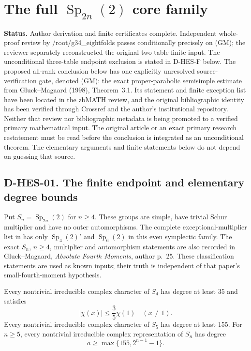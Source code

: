 \section{The full $\operatorname{Sp}_{2n}(2)$ core family}
\label{sec:higher-even-symplectic-draft}

\noindent\textbf{Status.} Author derivation and finite certificates complete. Independent whole-proof
review by /root/g34\_eightfolds passes conditionally precisely on (GM);
the reviewer separately reconstructed the original two-table finite input.
The unconditional three-table endpoint exclusion is stated in D-HES-F below. The proposed all-rank conclusion below
has one explicitly unresolved source-verification gate, denoted (GM): the exact
proper-parabolic semisimple estimate from Gluck--Magaard (1998), Theorem~3.1.
Its statement and finite exception list have been located in the zbMATH review,
and the original bibliographic identity has been verified through Crossref and
the author's institutional repository. Neither that review nor bibliographic
metadata is being promoted to a verified primary mathematical input. The
original article or an exact primary research restatement must be read before
the conclusion is integrated as an unconditional theorem. The elementary
arguments and finite statements below do not depend on guessing that source.

\subsection*{D-HES-01. The finite endpoint and elementary degree bounds}

Put $S_n=\operatorname{Sp}_{2n}(2)$ for $n\ge4$. These groups are simple,
have trivial Schur multiplier and have no outer automorphisms. The complete
exceptional-multiplier list in \cite[Chapter~5, Table~1, numbered p.~35]{BI:HHM}
has only $\operatorname{Sp}_4(2)'$ and $\operatorname{Sp}_6(2)$ in this
even symplectic family. The exact $S_n$, $n\ge4$, multiplier and automorphism
statements are also recorded in Gluck--Magaard, \emph{Absolute Fourth Moments},
author p.~25. These classification statements are used as known inputs; their
truth is independent of that paper's small-fourth-moment hypothesis.

\begin{lemma}
Every nontrivial irreducible complex character of $S_4$ has degree at least
$35$ and satisfies
\[
                   |\chi(x)|\le \frac35\chi(1)\quad(x\ne1).
\tag{HES.1}
\]
Every nontrivial irreducible complex character of $S_5$ has degree at least
$155$. For $n\ge5$, every nontrivial irreducible complex representation of
$S_n$ has degree
\[
                  a\ge \max\{155,2^{n-1}-1\}.
\tag{HES.2}
\]
\end{lemma}

